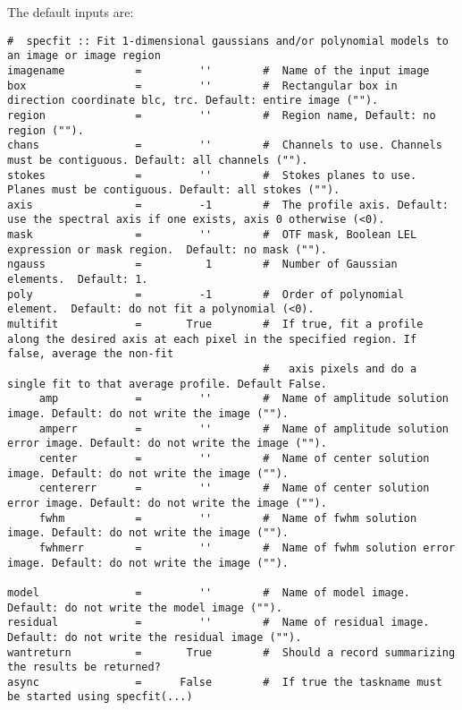 The default inputs are:
\small
\begin{verbatim}
#  specfit :: Fit 1-dimensional gaussians and/or polynomial models to an image or image region
imagename           =         ''        #  Name of the input image
box                 =         ''        #  Rectangular box in direction coordinate blc, trc. Default: entire image ("").
region              =         ''        #  Region name, Default: no region ("").
chans               =         ''        #  Channels to use. Channels must be contiguous. Default: all channels ("").
stokes              =         ''        #  Stokes planes to use. Planes must be contiguous. Default: all stokes ("").
axis                =         -1        #  The profile axis. Default: use the spectral axis if one exists, axis 0 otherwise (<0).
mask                =         ''        #  OTF mask, Boolean LEL expression or mask region.  Default: no mask ("").
ngauss              =          1        #  Number of Gaussian elements.  Default: 1.
poly                =         -1        #  Order of polynomial element.  Default: do not fit a polynomial (<0).
multifit            =       True        #  If true, fit a profile along the desired axis at each pixel in the specified region. If false, average the non-fit
                                        #   axis pixels and do a single fit to that average profile. Default False.
     amp            =         ''        #  Name of amplitude solution image. Default: do not write the image ("").
     amperr         =         ''        #  Name of amplitude solution error image. Default: do not write the image ("").
     center         =         ''        #  Name of center solution image. Default: do not write the image ("").
     centererr      =         ''        #  Name of center solution error image. Default: do not write the image ("").
     fwhm           =         ''        #  Name of fwhm solution image. Default: do not write the image ("").
     fwhmerr        =         ''        #  Name of fwhm solution error image. Default: do not write the image ("").

model               =         ''        #  Name of model image. Default: do not write the model image ("").
residual            =         ''        #  Name of residual image. Default: do not write the residual image ("").
wantreturn          =       True        #  Should a record summarizing the results be returned?
async               =      False        #  If true the taskname must be started using specfit(...)
\end{verbatim}
\normalsize




